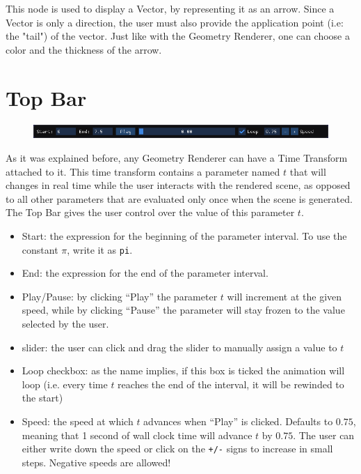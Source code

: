 This node is used to display a Vector, by representing it as an arrow.
Since a Vector is only a direction, the user must also provide the application point (i.e: the "tail") of the vector.
Just like with the Geometry Renderer, one can choose a color and the thickness of the arrow.

\section{Top Bar}

\begin{figure}[H]
\centering
\includegraphics[width=1.0\textwidth]{figures/top_bar.png}
\end{figure}

As it was explained before, any Geometry Renderer can have a Time Transform attached to it.
This time transform contains a parameter named $t$ that will changes in real time while the
user interacts with the rendered scene, as opposed to all other parameters that are evaluated
only once when the scene is generated.
The Top Bar gives the user control over the value of this parameter $t$.

\begin{itemize}
    \item Start: the expression for the beginning of the parameter interval. To use
        the constant $\pi$, write it as \texttt{pi}.
    \item End: the expression for the end of the parameter interval.
    \item Play/Pause: by clicking ``Play'' the parameter $t$ will increment at the given speed,
        while by clicking ``Pause'' the parameter will stay frozen to the value selected by the user.
    \item slider: the user can click and drag the slider to manually assign a value to $t$
    \item Loop checkbox: as the name implies, if this box is ticked the animation will loop
        (i.e. every time $t$ reaches the end of the interval, it will be rewinded to the start)
    \item Speed: the speed at which $t$ advances when ``Play'' is clicked. Defaults to $0.75$,
        meaning that 1 second of wall clock time will advance $t$ by $0.75$. The user can either
        write down the speed or click on the \texttt{+/-} signs to increase in small steps.
        Negative speeds are allowed!
\end{itemize}


